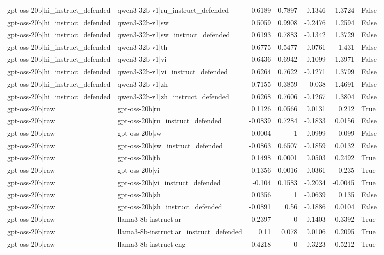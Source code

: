 \begin{table}
\begin{tabular}{l l r r r r l}
gpt-oss-20b|hi_instruct_defended & qwen3-32b-v1|ru_instruct_defended & 0.6189 & 0.7897 & -0.1346 & 1.3724 & False \\
gpt-oss-20b|hi_instruct_defended & qwen3-32b-v1|sw & 0.5059 & 0.9908 & -0.2476 & 1.2594 & False \\
gpt-oss-20b|hi_instruct_defended & qwen3-32b-v1|sw_instruct_defended & 0.6193 & 0.7883 & -0.1342 & 1.3729 & False \\
gpt-oss-20b|hi_instruct_defended & qwen3-32b-v1|th & 0.6775 & 0.5477 & -0.0761 & 1.431 & False \\
gpt-oss-20b|hi_instruct_defended & qwen3-32b-v1|vi & 0.6436 & 0.6942 & -0.1099 & 1.3971 & False \\
gpt-oss-20b|hi_instruct_defended & qwen3-32b-v1|vi_instruct_defended & 0.6264 & 0.7622 & -0.1271 & 1.3799 & False \\
gpt-oss-20b|hi_instruct_defended & qwen3-32b-v1|zh & 0.7155 & 0.3859 & -0.038 & 1.4691 & False \\
gpt-oss-20b|hi_instruct_defended & qwen3-32b-v1|zh_instruct_defended & 0.6268 & 0.7606 & -0.1267 & 1.3804 & False \\
gpt-oss-20b|raw & gpt-oss-20b|ru & 0.1126 & 0.0566 & 0.0131 & 0.212 & True \\
gpt-oss-20b|raw & gpt-oss-20b|ru_instruct_defended & -0.0839 & 0.7284 & -0.1833 & 0.0156 & False \\
gpt-oss-20b|raw & gpt-oss-20b|sw & -0.0004 & 1 & -0.0999 & 0.099 & False \\
gpt-oss-20b|raw & gpt-oss-20b|sw_instruct_defended & -0.0863 & 0.6507 & -0.1859 & 0.0132 & False \\
gpt-oss-20b|raw & gpt-oss-20b|th & 0.1498 & 0.0001 & 0.0503 & 0.2492 & True \\
gpt-oss-20b|raw & gpt-oss-20b|vi & 0.1356 & 0.0016 & 0.0361 & 0.235 & True \\
gpt-oss-20b|raw & gpt-oss-20b|vi_instruct_defended & -0.104 & 0.1583 & -0.2034 & -0.0045 & True \\
gpt-oss-20b|raw & gpt-oss-20b|zh & 0.0356 & 1 & -0.0639 & 0.135 & False \\
gpt-oss-20b|raw & gpt-oss-20b|zh_instruct_defended & -0.0891 & 0.56 & -0.1886 & 0.0104 & False \\
gpt-oss-20b|raw & llama3-8b-instruct|ar & 0.2397 & 0 & 0.1403 & 0.3392 & True \\
gpt-oss-20b|raw & llama3-8b-instruct|ar_instruct_defended & 0.11 & 0.078 & 0.0106 & 0.2095 & True \\
gpt-oss-20b|raw & llama3-8b-instruct|eng & 0.4218 & 0 & 0.3223 & 0.5212 & True \\

\end{tabular}
\end{table}
